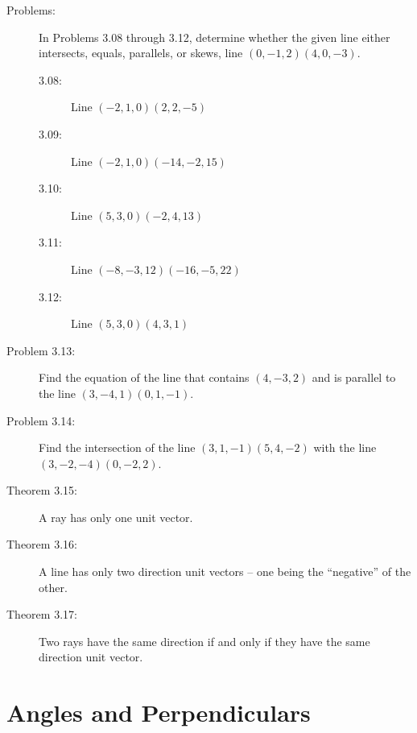 \documentclass{article}
\begin{document}
\begin{description}
  \item[Problems:] In Problems 3.08 through 3.12, determine whether the given line either intersects, equals, parallels, or skews, line $(0,-1,2) (4,0,-3)$.
    \begin{description}
      \item[3.08:] Line $(-2,1,0) (2,2,-5)$
      \item[3.09:] Line $(-2,1,0) (-14,-2,15)$
      \item[3.10:] Line $(5,3,0) (-2,4,13)$
      \item[3.11:] Line $(-8,-3,12) (-16,-5,22)$
      \item[3.12:] Line $(5,3,0) (4,3,1)$
    \end{description}

  \item[Problem 3.13:] Find the equation of the line that contains $(4,-3,2)$ and is parallel to the line $(3,-4,1) (0,1,-1)$.

  \item[Problem 3.14:] Find the intersection of the line $(3,1,-1) (5,4,-2)$ with the line $(3,-2,-4) (0,-2,2)$.

  \item[Theorem 3.15:] A ray has only one unit vector.

  \item[Theorem 3.16:] A line has only two direction unit vectors -- one being the ``negative'' of the other.

  \item[Theorem 3.17:] Two rays have the same direction if and only if they have the same direction unit vector.

\end{description}


\section{Angles and Perpendiculars}
\end{document}
